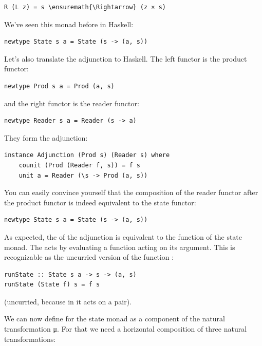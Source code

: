 \begin{Verbatim}[commandchars=\\\{\}]
R (L z) = s \ensuremath{\Rightarrow} (z × s)
\end{Verbatim}
We've seen this monad before in Haskell:

\begin{Verbatim}[commandchars=\\\{\}]
newtype State s a = State (s -> (a, s))
\end{Verbatim}
Let's also translate the adjunction to Haskell. The left functor is the
product functor:

\begin{Verbatim}[commandchars=\\\{\}]
newtype Prod s a = Prod (a, s)
\end{Verbatim}
and the right functor is the reader functor:

\begin{Verbatim}[commandchars=\\\{\}]
newtype Reader s a = Reader (s -> a)
\end{Verbatim}
They form the adjunction:

\begin{Verbatim}
instance Adjunction (Prod s) (Reader s) where
    counit (Prod (Reader f, s)) = f s
    unit a = Reader (\s -> Prod (a, s))
\end{Verbatim}
You can easily convince yourself that the composition of the reader
functor after the product functor is indeed equivalent to the state
functor:

\begin{Verbatim}[commandchars=\\\{\}]
newtype State s a = State (s -> (a, s))
\end{Verbatim}
As expected, the  of the adjunction is equivalent to the
 function of the state monad. The  acts by
evaluating a function acting on its argument. This is recognizable as
the uncurried version of the function :

\begin{Verbatim}[commandchars=\\\{\}]
runState :: State s a -> s -> (a, s)
runState (State f) s = f s
\end{Verbatim}
(uncurried, because in  it acts on a pair).

We can now define  for the state monad as a component of
the natural transformation μ. For that we need a horizontal composition
of three natural transformations:

